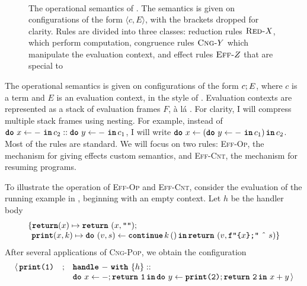 \begin{figure}[ht]
\begin{eff-desc}
{\[\begin{array}{rrcl}
\end{array}
\]
  }
\end{eff-desc}
\caption{The operational semantics of \efflang. The semantics is given on configurations of the form $\langle c, E \rangle$, with the brackets dropped for clarity. Rules are divided into three classes: reduction rules $\textsc{Red-}X$, which perform computation, congruence rules $\textsc{Cng-}Y$ which manipulate the evaluation context, and effect rules $\textsc{Eff-}Z$ that are special to \efflang}
\label{fig:efflang-opsem}
\end{figure}

The operational semantics is given on configurations of the form ${c}; {E}$, where $c$ is a term and $E$ is an evaluation context, in the style of \citet{felleisen-87}. Evaluation contexts are represented as a stack of evaluation frames $F$, à lá \citet{kiselyov-2012}. For clarity, I will compress multiple stack frames using nesting. For example, instead of $\texttt{\textbf{do}} \,\, {x} \leftarrow {-\,} \, \textbf{\texttt{in}} \, {c_2} :: \texttt{\textbf{do}} \,\, {y} \leftarrow {-\,} \, \textbf{\texttt{in}} \, {c_1}$, I will write $\texttt{\textbf{do}} \,\, {x} \leftarrow {(\texttt{\textbf{do}} \,\, {y} \leftarrow {-\,} \, \textbf{\texttt{in}} \, {c_1})} \, \textbf{\texttt{in}} \, {c_2}$. Most of the rules are standard. We will focus on two rules: \textsc{Eff-Op}, the mechanism for giving effects custom semantics, and \textsc{Eff-Cnt}, the mechanism for resuming programs. 

To illustrate the operation of \textsc{Eff-Op} and \textsc{Eff-Cnt}, consider the evaluation of the running example in , beginning with an empty context. Let $h$ be the handler body 
\[\begin{array}{l}\{ \textbf{\texttt{return}}(x) \mapsto {\texttt{\textbf{return}} \,\, {(x, \texttt{""})}}; \\
\; \, \textbf{\texttt{print}}(x, k) \mapsto {\texttt{\textbf{do}} \,\, {(v, s)} \leftarrow {\textbf{\texttt{continue}} \, {k} \, {()}} \, \textbf{\texttt{in}} \, {\texttt{\textbf{return}} \,\, {(v, \texttt{f"\{$x$\};"} \text{ \^\ } s)}}}\}\end{array}\]
After several applications of \textsc{Cng-Pop}, we obtain the configuration
{  \arraycolsep=3pt
\small
\[\begin{array}{rcl}
  \langle \, \texttt{\textbf{print}(1)} &;& \textbf{\texttt{handle}} \,\, {-} \,\, \textbf{\texttt{with}} \,\, \{{h}\} :: \\
                        && \texttt{\textbf{do}} \,\, {x} \leftarrow {-;\texttt{\textbf{return}} \,\, {\texttt{1}}} \, \textbf{\texttt{in}} \, {{\texttt{\textbf{do}} \,\, {y} \leftarrow {\texttt{\textbf{print}(2)};\texttt{\textbf{return}} \,\, {\texttt{2}}} \, \textbf{\texttt{in}} \, {\, x + y}}} \, \rangle
\end{array}
  \]
}

